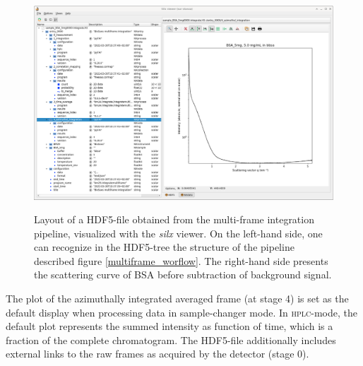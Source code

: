 \documentclass[preprint]{iucr}              %
\begin{document}
\begin{figure}
     \caption{Layout of a HDF5-file obtained from the multi-frame integration pipeline, visualized with the \textit{silx} viewer.
     On the left-hand side, one can recognize in the HDF5-tree the structure of the pipeline described figure \ref{multiframe_worflow}.
     The right-hand side presents the scattering curve of BSA before subtraction of background signal.}
     \includegraphics*[width=12cm]{multiframe.eps}
     \label{multiframe}
\end{figure}

The plot of the azimuthally integrated averaged frame (at stage 4) is set as the default display  when processing data in sample-changer mode.
In \textsc{hplc}-mode, the default plot represents the summed intensity as function of time, which is a fraction of the complete chromatogram. 
The HDF5-file additionally includes external links to the raw frames as acquired by the detector (stage 0).

\end{document}
